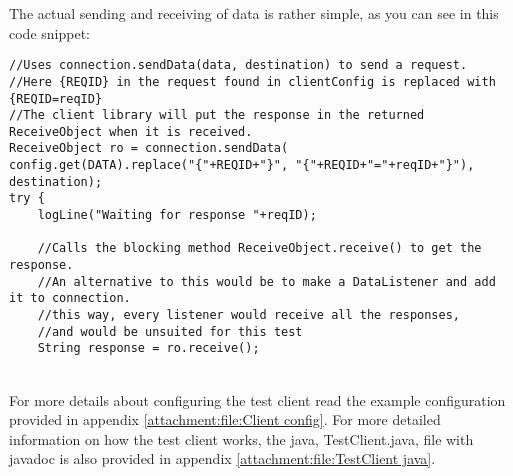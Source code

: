     The actual sending and receiving of data is rather simple, as you can see in this code snippet:
    \lstset{language=Java, style=java}
    \lstset{frame=single}
    \lstset{breaklines=true}
    \begin{lstlisting}
//Uses connection.sendData(data, destination) to send a request.
//Here {REQID} in the request found in clientConfig is replaced with {REQID=reqID}
//The client library will put the response in the returned ReceiveObject when it is received.
ReceiveObject ro = connection.sendData(
config.get(DATA).replace("{"+REQID+"}", "{"+REQID+"="+reqID+"}"), destination);
try {
    logLine("Waiting for response "+reqID);

    //Calls the blocking method ReceiveObject.receive() to get the response.
    //An alternative to this would be to make a DataListener and add it to connection.
    //this way, every listener would receive all the responses,
    //and would be unsuited for this test
    String response = ro.receive();
    \end{lstlisting}
    \\
    For more details about configuring the test client read the example configuration provided in appendix \ref{attachment:file:Client config}. For more detailed information on how the test client works, the java, TestClient.java, file with javadoc is also provided in appendix \ref{attachment:file:TestClient java}.

